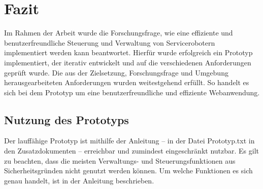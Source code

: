 \newpage
\section{Fazit}
Im Rahmen der Arbeit wurde die Forschungsfrage, wie eine effiziente und benutzerfreundliche Steuerung und Verwaltung von Servicerobotern implementiert werden kann beantwortet. Hierfür wurde erfolgreich ein Prototyp implementiert, der iterativ entwickelt und auf die verschiedenen Anforderungen geprüft wurde. Die aus der Zielsetzung, Forschungsfrage und Umgebung herausgearbeiteten Anforderungen wurden weitestgehend erfüllt. So handelt es sich bei dem Prototyp um eine benutzerfreundliche und effiziente Webanwendung.

\subsection{Nutzung des Prototyps}
Der lauffähige Prototyp ist mithilfe der Anleitung – in der Datei Prototyp.txt in den Zusatzdokumenten – erreichbar und zumindest eingeschränkt nutzbar. Es gilt zu beachten, dass die meisten Verwaltungs- und Steuerungsfunktionen aus Sicherheitsgründen nicht genutzt werden können. Um welche Funktionen es sich genau handelt, ist in der Anleitung beschrieben.


